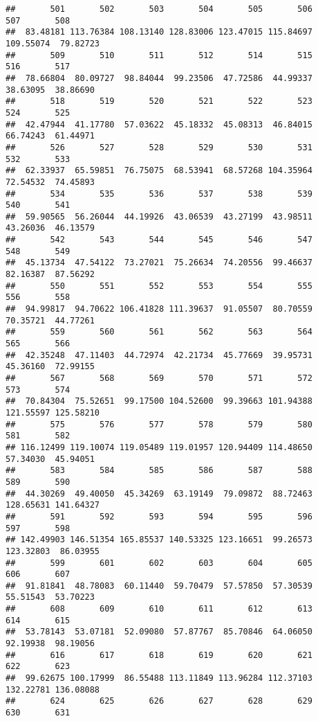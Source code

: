 \documentclass[
]{article}
\begin{document}
\begin{verbatim}
##       501       502       503       504       505       506       507       508 
##  83.48181 113.76384 108.13140 128.83006 123.47015 115.84697 109.55074  79.82723 
##       509       510       511       512       514       515       516       517 
##  78.66804  80.09727  98.84044  99.23506  47.72586  44.99337  38.63095  38.86690 
##       518       519       520       521       522       523       524       525 
##  42.47944  41.17780  57.03622  45.18332  45.08313  46.84015  66.74243  61.44971 
##       526       527       528       529       530       531       532       533 
##  62.33937  65.59851  76.75075  68.53941  68.57268 104.35964  72.54532  74.45893 
##       534       535       536       537       538       539       540       541 
##  59.90565  56.26044  44.19926  43.06539  43.27199  43.98511  43.26036  46.13579 
##       542       543       544       545       546       547       548       549 
##  45.13734  47.54122  73.27021  75.26634  74.20556  99.46637  82.16387  87.56292 
##       550       551       552       553       554       555       556       558 
##  94.99817  94.70622 106.41828 111.39637  91.05507  80.70559  70.35721  44.77261 
##       559       560       561       562       563       564       565       566 
##  42.35248  47.11403  44.72974  42.21734  45.77669  39.95731  45.36160  72.99155 
##       567       568       569       570       571       572       573       574 
##  70.84304  75.52651  99.17500 104.52600  99.39663 101.94388 121.55597 125.58210 
##       575       576       577       578       579       580       581       582 
## 116.12499 119.10074 119.05489 119.01957 120.94409 114.48650  57.34030  45.94051 
##       583       584       585       586       587       588       589       590 
##  44.30269  49.40050  45.34269  63.19149  79.09872  88.72463 128.65631 141.64327 
##       591       592       593       594       595       596       597       598 
## 142.49903 146.51354 165.85537 140.53325 123.16651  99.26573 123.32803  86.03955 
##       599       601       602       603       604       605       606       607 
##  91.81841  48.78083  60.11440  59.70479  57.57850  57.30539  55.51543  53.70223 
##       608       609       610       611       612       613       614       615 
##  53.78143  53.07181  52.09080  57.87767  85.70846  64.06050  92.19938  98.19056 
##       616       617       618       619       620       621       622       623 
##  99.62675 100.17999  86.55488 113.11849 113.96284 112.37103 132.22781 136.08088 
##       624       625       626       627       628       629       630       631 

\end{verbatim}
\end{document}
